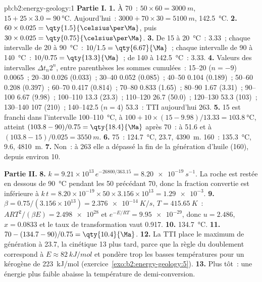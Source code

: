 \begin{solution}{pb:b2:energy-geology:1}
\noindent\textbf{Partie I.}
\textbf{1.} À \qty{70}{\Ma}~: $50 \times 60 = \qty{3000}{m}$, $15 + 25 \times 3.0 =
\qty{90}{\celsius}$. Aujourd'hui~: $3000 + 70 \times 30 = \qty{5100}{m}$, \qty{142.5}{\celsius}.
\textbf{2.} $60 \times 0.025 = \qty{1.5}{\celsius\per\Ma}$, puis $30 \times 0.025 =
\qty{0.75}{\celsius\per\Ma}$.
\textbf{3.} De 15 à \qty{20}{\celsius}~: \qty{3.33}{\Ma}~; chaque intervalle de 20 à \qty{90}{\celsius}~:
$10/1.5 = \qty{6.67}{\Ma}$~; chaque intervalle de 90 à \qty{140}{\celsius}~: $10/0.75 = \qty{13.3}{\Ma}$~;
de 140 à \qty{142.5}{\celsius}~: \qty{3.33}{\Ma}.
\textbf{4.} Valeurs des intervalles $\Delta t_n 2^n$, entre parenthèses les sommes cumulées~: 15--20 ($n = -9$) 0.0065~; 20--30
0.026 (0.033)~; 30--40 0.052 (0.085)~; 40--50 0.104 (0.189)~; 50--60 0.208 (0.397)~; 60--70 0.417
(0.814)~; 70--80 0.833 (1.65)~; 80--90 1.67 (3.31)~; 90--100 6.67 (9.98)~; 100--110 13.3 (23.3)~;
110--120 26.7 (50.0)~; 120--130 53.3 (103)~; 130--140 107 (210)~; 140--142.5 ($n = 4$) 53.3~: TTI
aujourd'hui 263.
\textbf{5.} 15 est franchi dans l'intervalle 100--\qty{110}{\celsius}, à $100 + 10 \times
(15 - 9.98)/13.33 = \qty{103.8}{\celsius}$, atteint $(103.8 - 90)/0.75 = \qty{18.4}{\Ma}$ après
\qty{70}{\Ma}~: à \qty{51.6}{\Ma} et à $(103.8 - 15)/0.025 = \qty{3550}{m}$.
\textbf{6.} 75~: \qty{124.7}{\celsius}, \qty{23.7}{\Ma}, \qty{4390}{m}. 160~: \qty{135.3}{\celsius},
\qty{9.6}{\Ma}, \qty{4810}{m}.
\textbf{7.} Non~: à 263 elle a dépassé la fin de la génération d'huile (160), depuis environ \qty{10}{\Ma}.

\noindent\textbf{Partie II.}
\textbf{8.} $k = 9.21 \times 10^{13}\,e^{-26800/363.15} = \qty{8.20e-19}{s^{-1}}$. La roche est restée
en dessous de \qty{90}{\celsius} pendant les \qty{50}{\Ma} précédant \qty{70}{\Ma}, donc la fraction convertie est
inférieure à $k\,t = 8.20 \times 10^{-19} \times 50 \times 3.156 \times 10^{13} = \num{1.29e-3}$.
\textbf{9.} $\beta = 0.75/(3.156 \times 10^{13}) = \qty{2.376e-14}{K/s}$, $T = \qty{415.65}{K}$~:
$ART^2/(\beta E) = \num{2.498e28}$ et $e^{-E/RT} = \num{9.95e-29}$, donc $u = 2.486$, $x = 0.0833$ et
le taux de transformation vaut 0.917.
\textbf{10.} \qty{134.7}{\celsius}.
\textbf{11.} $70 - (134.7 - 90)/0.75 = \qty{10.4}{\Ma}$.
\textbf{12.} La TTI place le maximum de génération à \qty{23.7}{\Ma}, la cinétique \qty{13}{\Ma} plus tard,
parce que la règle du doublement correspond à $E \approx \qty{82}{kJ/mol}$ et pondère trop les basses températures
pour un kérogène de \qty{223}{kJ/mol} (exercice~\ref{exo:b2:energy-geology:5}).
\textbf{13.} Plus tôt~: une énergie plus faible abaisse la température de demi-conversion.


\end{solution}
